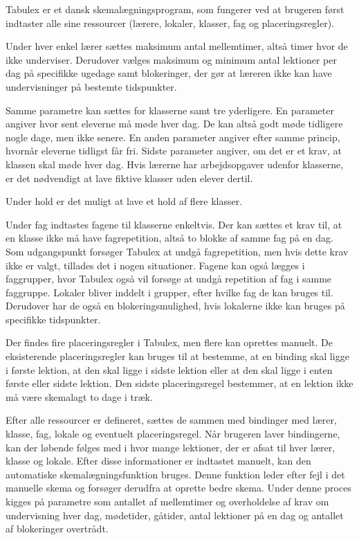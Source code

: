 Tabulex er et dansk skemalægningsprogram, som fungerer ved at brugeren først indtaster alle sine ressourcer (lærere, lokaler, klasser, fag og placeringsregler). 

Under hver enkel lærer sættes maksimum antal mellemtimer, altså timer hvor de ikke underviser. Derudover vælges maksimum og minimum antal lektioner per dag på specifikke ugedage samt blokeringer, der gør at læreren ikke kan have undervisninger på bestemte tidspunkter. 

Samme parametre kan sættes for klasserne samt tre yderligere. En parameter angiver hvor sent eleverne må møde hver dag. De kan altså godt møde tidligere nogle dage, men ikke senere. En anden parameter angiver efter samme princip, hvornår eleverne tidligst får fri. Sidste parameter angiver, om det er et krav, at klassen skal møde hver dag. Hvis lærerne har arbejdsopgaver udenfor klasserne, er det nødvendigt at lave fiktive klasser uden elever dertil.

Under hold er det muligt at lave et hold af flere klasser.

Under fag indtastes fagene til klasserne enkeltvis. Der kan sættes et krav til, at en klasse ikke må have fagrepetition, altså to blokke af samme fag på en dag. Som udgangspunkt forsøger Tabulex at undgå fagrepetition, men hvis dette krav ikke er valgt, tillades det i nogen situationer. Fagene kan også lægges i faggrupper, hvor Tabulex også vil forsøge at undgå repetition af fag i samme faggruppe. Lokaler bliver inddelt i grupper, efter hvilke fag de kan bruges til. Derudover har de også en blokeringsmulighed, hvis lokalerne ikke kan bruges på specifikke tidspunkter.

Der findes fire placeringsregler i Tabulex, men flere kan oprettes manuelt. De eksisterende placeringsregler kan bruges til at bestemme, at en binding skal ligge i første lektion, at den skal ligge i sidste lektion eller at den skal ligge i enten første eller sidste lektion. Den sidste placeringsregel bestemmer, at en lektion ikke må være skemalagt to dage i træk.

Efter alle ressourcer er defineret, sættes de sammen med bindinger med lærer, klasse, fag, lokale og eventuelt placeringsregel. Når brugeren laver bindingerne, kan der løbende følges med i hvor mange lektioner, der er afsat til hver lærer, klasse og lokale.
Efter disse informationer er indtastet manuelt, kan den automatiske skemalægningsfunktion bruges. Denne funktion leder efter fejl i det manuelle skema og forsøger derudfra at oprette bedre skema. Under denne proces kigges på parametre som antallet af mellemtimer og overholdelse af krav om undervisning hver dag, mødetider, gåtider, antal lektioner på en dag og antallet af blokeringer overtrådt.
